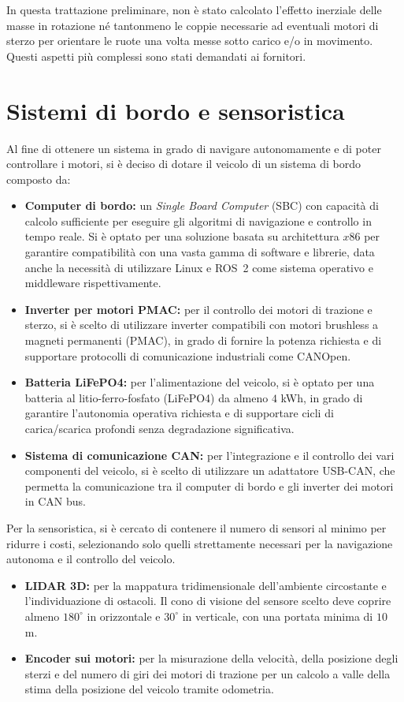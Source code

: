\begin{note}
    In questa trattazione preliminare, non è stato calcolato l'effetto inerziale delle masse in rotazione né tantonmeno le coppie necessarie ad eventuali motori di sterzo per orientare le ruote una volta messe sotto carico e/o in movimento. Questi aspetti più complessi sono stati demandati ai fornitori.
\end{note}

\section{Sistemi di bordo e sensoristica}
Al fine di ottenere un sistema in grado di navigare autonomamente e di poter controllare i motori, si è deciso di dotare il veicolo di un sistema di bordo composto da:
\begin{itemize}
    \item \textbf{Computer di bordo:} un \textit{Single Board Computer} (SBC) con capacità di calcolo sufficiente per eseguire gli algoritmi di navigazione e controllo in tempo reale. Si è optato per una soluzione basata su architettura $x86$ per garantire compatibilità con una vasta gamma di software e librerie, data anche la necessità di utilizzare Linux e ROS~2 come sistema operativo e middleware rispettivamente.
    \item \textbf{Inverter per motori PMAC:} per il controllo dei motori di trazione e sterzo, si è scelto di utilizzare inverter compatibili con motori brushless a magneti permanenti (PMAC), in grado di fornire la potenza richiesta e di supportare protocolli di comunicazione industriali come CANOpen.
    \item \textbf{Batteria LiFePO4:} per l'alimentazione del veicolo, si è optato per una batteria al litio-ferro-fosfato (LiFePO4) da almeno $4$ kWh, in grado di garantire l'autonomia operativa richiesta e di supportare cicli di carica/scarica profondi senza degradazione significativa.
    \item \textbf{Sistema di comunicazione CAN:} per l'integrazione e il controllo dei vari componenti del veicolo, si è scelto di utilizzare un adattatore USB-CAN, che permetta la comunicazione tra il computer di bordo e gli inverter dei motori in CAN bus.
\end{itemize}
Per la sensoristica, si è cercato di contenere il numero di sensori al minimo per ridurre i costi, selezionando solo quelli strettamente necessari per la navigazione autonoma e il controllo del veicolo.
\begin{itemize}
    \item \textbf{LIDAR 3D:} per la mappatura tridimensionale dell'ambiente circostante e l'individuazione di ostacoli. Il cono di visione del sensore scelto deve coprire almeno $180^\circ$ in orizzontale e $30^\circ$ in verticale, con una portata minima di $10$ m.
    \item \textbf{Encoder sui motori:} per la misurazione della velocità, della posizione degli sterzi e del numero di giri dei motori di trazione per un calcolo a valle della stima della posizione del veicolo tramite odometria.
\end{itemize}
